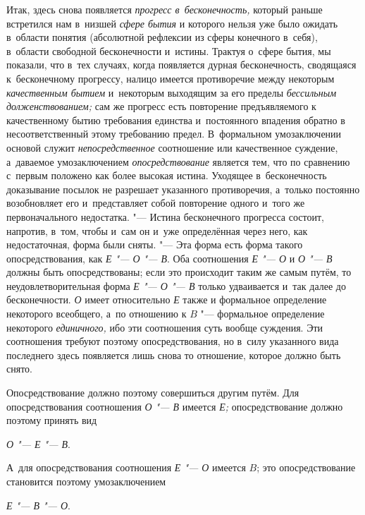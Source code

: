 Итак, здесь снова появляется
{\em прогресс в~бесконечность,}
который раньше встретился нам в~низшей
{\em сфере бытия} и
которого нельзя уже было ожидать в~области понятия (абсолютной рефлексии из
сферы конечного в~себя), в~области свободной бесконечности и~истины.
Трактуя о~сфере бытия, мы показали, что в~тех случаях, когда появляется
дурная бесконечность, сводящаяся к~бесконечному прогрессу, налицо имеется
противоречие между некоторым
{\em качественным бытием}
и~некоторым выходящим за его пределы
{\em бессильным долженствованием;}
сам же прогресс есть повторение предъявляемого к
качественному бытию требования единства и~постоянного впадения обратно в
несоответственный этому требованию предел. В~формальном умозаключении
основой служит {\em непосредственное}
соотношение или качественное суждение, а~даваемое
умозаключением {\em опосредствование}
является тем, что по сравнению с~первым положено как более
высокая истина. Уходящее в~бесконечность доказывание посылок не разрешает
указанного противоречия, а~только постоянно возобновляет его и~представляет
собой повторение одного и~того же первоначального недостатка. "---
Истина бесконечного прогресса состоит, напротив, в~том, чтобы
и~сам он и~уже определённая через него, как недостаточная, форма были
сняты. "--- Эта форма есть форма такого опосредствования, как
{\em Е "--- О "--- В}. Оба соотношения {\em Е "--- О} и {\em О
"--- В} должны быть опосредствованы; если это
происходит таким же самым путём, то неудовлетворительная форма {\em Е "--- О
"--- В} только удваивается и~так далее до
бесконечности. {\em О} имеет относительно {\em Е} также и
формальное определение некоторого всеобщего, а~по отношению к
$B$ "--- формальное определение некоторого
{\em единичного,} ибо эти
соотношения суть вообще суждения. Эти соотношения требуют поэтому
опосредствования, но в~силу указанного вида последнего здесь появляется
лишь снова то отношение, которое должно быть снято.

Опосредствование должно поэтому совершиться другим путём. Для
опосредствования соотношения {\em О "--- В} имеется
{\em Е;} опосредствование должно поэтому принять вид

{\centering
{\em О "--- Е
"--- В}.
\par}

А~для опосредствования соотношения {\em Е "--- О}
имеется $B$; это опосредствование становится поэтому умозаключением

{\centering
{\em Е "--- В
"--- О}.
\par}

